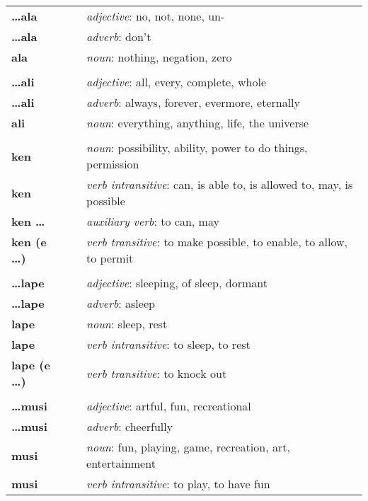 \begin{supertabular}{p{2,5cm}|ll}
\textbf{\dots ala} && \textit{adjective}: no, not, none, un- \\ %
\textbf{\dots ala} && \textit{adverb}: don't \\ %
\textbf{ala} && \textit{noun}: nothing, negation, zero \\ %
 && \\ %
\textbf{\dots ali} && \textit{adjective}: all, every, complete, whole \\ %
\textbf{\dots ali} && \textit{adverb}: always, forever, evermore, eternally \\ %
\textbf{ali} && \textit{noun}: everything, anything, life, the universe \\ %
 && \\ %
\textbf{ken} && \textit{noun}: possibility, ability, power to do things, permission \\ %
\textbf{ken} && \textit{verb intransitive}: can, is able to, is allowed to, may, is possible \\ %
\textbf{ken \dots} && \textit{auxiliary verb}: to can, may \\ %
\textbf{ken (e \dots)} && \textit{verb transitive}: to make possible, to enable, to allow, to permit \\ %
 && \\ %
\textbf{\dots lape} && \textit{adjective}: sleeping, of sleep, dormant \\ %
\textbf{\dots lape} && \textit{adverb}: asleep \\ %
\textbf{lape} && \textit{noun}: sleep, rest \\ %
\textbf{lape} && \textit{verb intransitive}: to sleep, to rest \\ %
\textbf{lape (e \dots)} && \textit{verb transitive}: to knock out \\ %
 && \\ %
\textbf{\dots musi} && \textit{adjective}: artful, fun, recreational \\ %
\textbf{\dots musi} && \textit{adverb}: cheerfully \\ %
\textbf{musi} && \textit{noun}: fun, playing, game, recreation, art, entertainment \\ %
\textbf{musi} && \textit{verb intransitive}: to play, to have fun \\ %

\end{supertabular}
